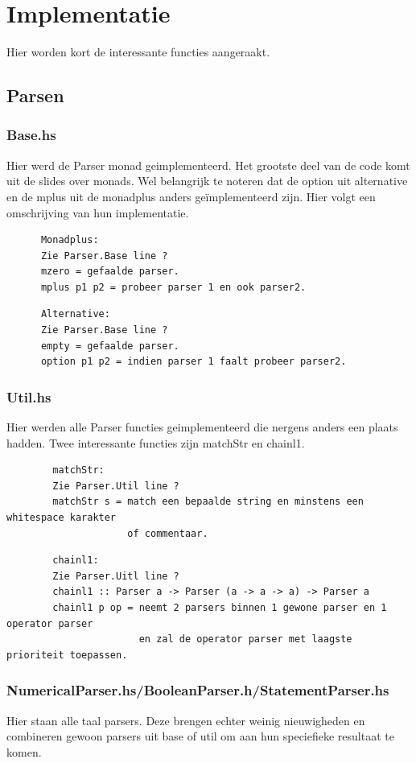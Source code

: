 \documentclass[a4paper,10pt]{article}
\begin{document}
\section{Implementatie}

  Hier worden kort de interessante functies aangeraakt.
  \subsection{Parsen}
    \subsubsection{Base.hs}
    Hier werd de Parser monad geimplementeerd. Het grootste deel van de code komt uit de slides over monads.
    Wel belangrijk te noteren dat de option uit alternative en de mplus uit de monadplus anders geïmplementeerd zijn.
    Hier volgt een omschrijving van hun implementatie.

      \begin{verbatim}
      Monadplus:
      Zie Parser.Base line ?
      mzero = gefaalde parser.
      mplus p1 p2 = probeer parser 1 en ook parser2.
      \end{verbatim}

      \begin{verbatim}
      Alternative:
      Zie Parser.Base line ?
      empty = gefaalde parser.
      option p1 p2 = indien parser 1 faalt probeer parser2.
      \end{verbatim}
    \subsubsection{Util.hs}
      Hier werden alle Parser functies geimplementeerd die nergens anders een plaats hadden.
      Twee interessante functies zijn matchStr en chainl1.
        \begin{verbatim}
        matchStr:
        Zie Parser.Util line ?
        matchStr s = match een bepaalde string en minstens een whitespace karakter 
                     of commentaar.
        \end{verbatim}
        \begin{verbatim}
        chainl1:
        Zie Parser.Uitl line ?
        chainl1 :: Parser a -> Parser (a -> a -> a) -> Parser a
        chainl1 p op = neemt 2 parsers binnen 1 gewone parser en 1 operator parser 
                       en zal de operator parser met laagste prioriteit toepassen.
        \end{verbatim}
    \subsubsection{NumericalParser.hs/BooleanParser.h/StatementParser.hs}
    Hier staan alle taal parsers. Deze brengen echter weinig nieuwigheden en
    combineren gewoon parsers uit base of util om aan hun speciefieke resultaat te komen.
\end{document}
